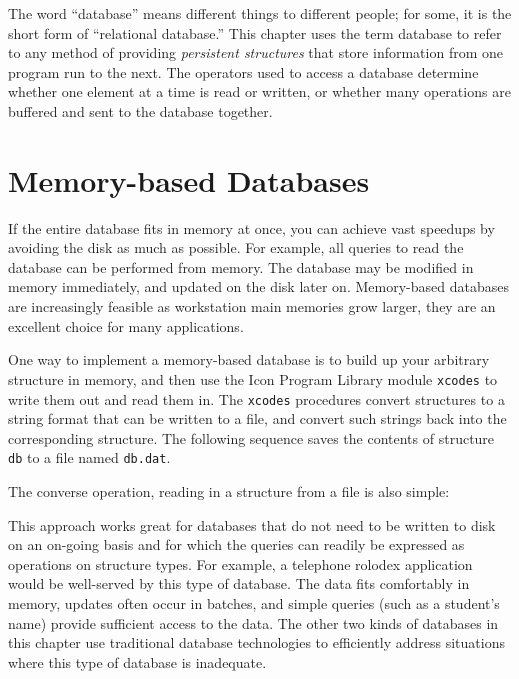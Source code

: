 The word ``database'' means different things to different people; for
some, it is the short form of ``relational database.'' This chapter
uses the term database to refer to any method of providing
{\em persistent structures\/} that store information from one program
run to the next. The operators used to access a database determine
whether one element at a time is read or written, or whether many
operations are buffered and sent to the database together.

\section{Memory-based Databases}

If the entire database fits in memory at once, you can achieve vast
speedups by avoiding the disk as much as possible. For example, all
queries to read the database can be performed from memory.  The
database may be modified in memory immediately, and updated on the
disk later on. Memory-based databases are increasingly feasible as
workstation main memories grow larger, they are an excellent choice
for many applications.

One way to implement a memory-based database is to build up your
arbitrary structure in memory, and then use the Icon Program Library
module \texttt{xcodes} to write them out and read them
in. The \texttt{xcodes} procedures convert structures
to a string format that can be written to a file, and convert
such strings back into the corresponding structure.
The following sequence saves the
contents of structure \texttt{db} to a file named \texttt{db.dat}.


\noindent
The converse operation, reading in a structure from a file is also
simple:


This approach works great for databases that do not need to be written
to disk on an on-going basis and for which the queries can readily be
expressed as operations on structure types. For example, a telephone
rolodex application would be well-served by this type of database. The
data fits comfortably in memory, updates often occur in batches, and
simple queries (such as a student's name) provide
sufficient access to the data. The other two kinds of databases in this
chapter use traditional database technologies to efficiently address
situations where this type of database is inadequate.

